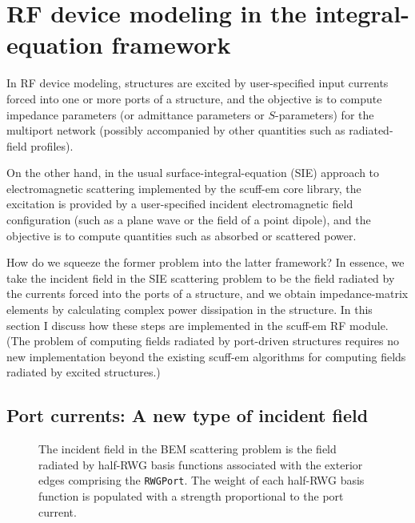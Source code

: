 \documentclass[letterpaper]{article}
\begin{document}
\newpage

\section{RF device modeling in the integral-equation framework}
\label{RFDeviceModeling}

In RF device modeling, structures are excited by user-specified input currents
forced into one or more ports of a structure, and the objective is to compute
impedance parameters (or admittance parameters or $S$-parameters) for the 
multiport network (possibly accompanied by other quantities such as 
radiated-field profiles).

On the other hand, in the usual surface-integral-equation (SIE)
approach to electromagnetic scattering implemented by the {\sc scuff-em}
core library, the excitation is provided by a user-specified
incident electromagnetic field configuration (such as a plane wave
or the field of a point dipole),
and the objective is to compute quantities such as absorbed or scattered
power.

How do we squeeze the former problem into the latter framework?
In essence, we take the incident field in the SIE scattering problem
to be the field radiated by the currents forced into the ports
of a structure, and we obtain impedance-matrix elements by calculating
complex power dissipation in the structure.
In this section I discuss how these steps are implemented
in the {\sc scuff-em} RF module.
(The problem of computing fields radiated by port-driven structures
requires no new implementation beyond the existing {\sc scuff-em} 
algorithms for computing fields radiated by excited structures.)

\subsection{Port currents: A new type of incident field}

\begin{figure}
\begin{center}
\caption{The incident field in the BEM scattering problem
         is the field radiated by half-RWG basis functions
         associated with the exterior edges comprising the
         \texttt{RWGPort}.
         The weight of each
half-RWG basis function is populated with
         a strength proportional to the port current.
        }
\label{PortCurrentFigure}
\end{center}
\end{figure}
\end{document}

